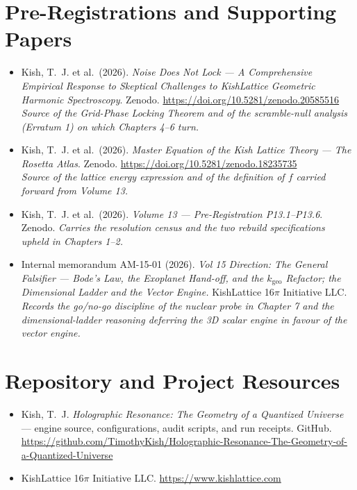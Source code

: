 \documentclass[11pt, letterpaper, openany]{book}
\newcommand{\kgeo}{k_{\mathrm{geo}}}
\begin{document}
\section*{Pre-Registrations and Supporting Papers}

\begin{itemize}
    \item Kish, T.~J. et al.\ (2026). \textit{Noise Does Not Lock --- A Comprehensive Empirical
          Response to Skeptical Challenges to KishLattice Geometric Harmonic Spectroscopy}.
          Zenodo. \url{https://doi.org/10.5281/zenodo.20585516}
          \\ \textit{Source of the Grid-Phase Locking Theorem and of the scramble-null analysis
          (Erratum 1) on which Chapters 4--6 turn.}
    \item Kish, T.~J. et al.\ (2026). \textit{Master Equation of the Kish Lattice Theory --- The
          Rosetta Atlas}. Zenodo. \url{https://doi.org/10.5281/zenodo.18235735}
          \\ \textit{Source of the lattice energy expression and of the definition of $f$ carried
          forward from Volume 13.}
    \item Kish, T.~J. et al.\ (2026). \textit{Volume 13 --- Pre-Registration P13.1--P13.6}.
          Zenodo. \textit{Carries the resolution census and the two rebuild specifications upheld in
          Chapters 1--2.}
    \item Internal memorandum AM-15-01 (2026). \textit{Vol 15 Direction: The General Falsifier ---
          Bode's Law, the Exoplanet Hand-off, and the $\kgeo$ Refactor; the Dimensional Ladder and
          the Vector Engine.} KishLattice 16$\pi$ Initiative LLC.
          \\ \textit{Records the go/no-go discipline of the nuclear probe in Chapter 7 and the
          dimensional-ladder reasoning deferring the 3D scalar engine in favour of the vector engine.}
\end{itemize}

\section*{Repository and Project Resources}

\begin{itemize}
    \item Kish, T.~J. \textit{Holographic Resonance: The Geometry of a Quantized Universe} --- engine
          source, configurations, audit scripts, and run receipts. GitHub.
          \url{https://github.com/TimothyKish/Holographic-Resonance-The-Geometry-of-a-Quantized-Universe}
    \item KishLattice 16$\pi$ Initiative LLC. \url{https://www.kishlattice.com}
\end{itemize}
\end{document}
